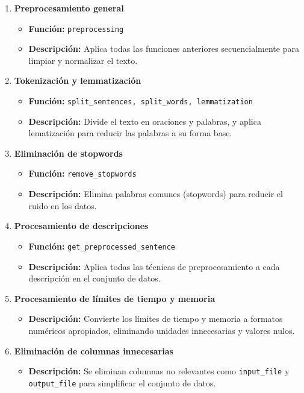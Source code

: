 \documentclass{article}
\begin{document}
\begin{enumerate}
\begin{itemize}
          \end{itemize}
    \item \textbf{Preprocesamiento general}
          \begin{itemize}
              \item \textbf{Función:} \texttt{preprocessing}
              \item \textbf{Descripción:} Aplica todas las funciones anteriores secuencialmente para limpiar y normalizar el texto.
          \end{itemize}
    \item \textbf{Tokenización y lemmatización}
          \begin{itemize}
              \item \textbf{Función:} \texttt{split\_sentences, split\_words, lemmatization}
              \item \textbf{Descripción:} Divide el texto en oraciones y palabras, y aplica lematización para reducir las palabras a su forma base.
          \end{itemize}
    \item \textbf{Eliminación de stopwords}
          \begin{itemize}
              \item \textbf{Función:} \texttt{remove\_stopwords}
              \item \textbf{Descripción:} Elimina palabras comunes (stopwords) para reducir el ruido en los datos.
          \end{itemize}
    \item \textbf{Procesamiento de descripciones}
          \begin{itemize}
              \item \textbf{Función:} \texttt{get\_preprocessed\_sentence}
              \item \textbf{Descripción:} Aplica todas las técnicas de preprocesamiento a cada descripción en el conjunto de datos.
          \end{itemize}
    \item \textbf{Procesamiento de límites de tiempo y memoria}
          \begin{itemize}
              \item \textbf{Descripción:} Convierte los límites de tiempo y memoria a formatos numéricos apropiados, eliminando unidades innecesarias y valores nulos.
          \end{itemize}
    \item \textbf{Eliminación de columnas innecesarias}
          \begin{itemize}
              \item \textbf{Descripción:} Se eliminan columnas no relevantes como \texttt{input\_file} y \texttt{output\_file} para simplificar el conjunto de datos.
          \end{itemize}
\end{enumerate}
\end{document}
